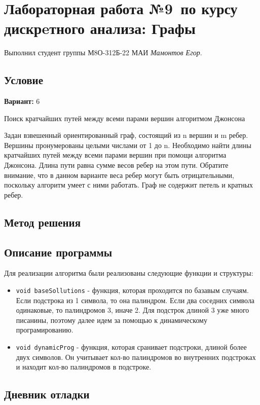 \documentclass[12pt]{article}
\begin{document}
\section*{Лабораторная работа №9\, по курсу дискрeтного анализа: Графы}

Выполнил студент группы М8О-312Б-22 МАИ \textit{Мамонтов Егор}.

\subsection*{Условие}

\textbf{Вариант:} 6

Поиск кратчайших путей между всеми парами вершин алгоритмом Джонсона

Задан взвешенный ориентированный граф, состоящий из n вершин и m ребер. Вершины пронумерованы целыми числами от 1 до n. Необходимо найти длины кратчайших путей между всеми парами вершин при помощи алгоритма Джонсона. Длина пути равна сумме весов ребер на этом пути. Обратите внимание, что в данном варианте веса ребер могут быть отрицательными, поскольку алгоритм умеет с ними работать. Граф не содержит петель и кратных ребер.
\newpage
\subsection*{Метод решения}

\subsection*{Описание программы}

Для реализации алгоритма были реализованы следующие функции и структуры:
\begin{itemize}
    \item \texttt{void baseSollutions} - функция, которая проходится по базавым случаям. Если подстрока из 1 символа, то она палиндром. Если два соседних символа одинаковые, то палиндромов 3, иначе 2. Для подстрок длиной 3 уже много писанины, поэтому далее идем за помощью к динамическому програмированию.
    \item \texttt{void dynamicProg} - функция, которая сранивает подстроки, длиной более двух символов. Он учитывает кол-во палиндромов во внутренних подстроках и находит кол-во палиндромов в подстроке.
\end{itemize}

\newpage
\subsection*{Дневник отладки}
\end{document}
